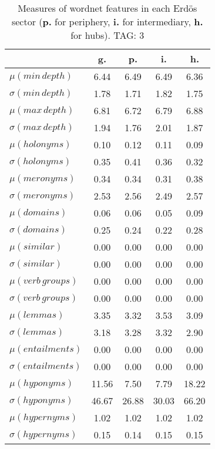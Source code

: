 \begin{table}[h!]
\begin{center}
\begin{tabular}{| l | c | c | c | c |}\hline
 & g. & p. & i. & h. \\\hline
$\mu(min\,depth)$ & 6.44  & 6.49  & 6.49  & 6.36 \\\hline
$\sigma(min\,depth)$ & 1.78  & 1.71  & 1.82  & 1.75 \\\hline
$\mu(max\,depth)$ & 6.81  & 6.72  & 6.79  & 6.88 \\\hline
$\sigma(max\,depth)$ & 1.94  & 1.76  & 2.01  & 1.87 \\\hline
$\mu(holonyms)$ & 0.10  & 0.12  & 0.11  & 0.09 \\\hline
$\sigma(holonyms)$ & 0.35  & 0.41  & 0.36  & 0.32 \\\hline
$\mu(meronyms)$ & 0.34  & 0.34  & 0.31  & 0.38 \\\hline
$\sigma(meronyms)$ & 2.53  & 2.56  & 2.49  & 2.57 \\\hline
$\mu(domains)$ & 0.06  & 0.06  & 0.05  & 0.09 \\\hline
$\sigma(domains)$ & 0.25  & 0.24  & 0.22  & 0.28 \\\hline
$\mu(similar)$ & 0.00  & 0.00  & 0.00  & 0.00 \\\hline
$\sigma(similar)$ & 0.00  & 0.00  & 0.00  & 0.00 \\\hline
$\mu(verb\,groups)$ & 0.00  & 0.00  & 0.00  & 0.00 \\\hline
$\sigma(verb\,groups)$ & 0.00  & 0.00  & 0.00  & 0.00 \\\hline
$\mu(lemmas)$ & 3.35  & 3.32  & 3.53  & 3.09 \\\hline
$\sigma(lemmas)$ & 3.18  & 3.28  & 3.32  & 2.90 \\\hline
$\mu(entailments)$ & 0.00  & 0.00  & 0.00  & 0.00 \\\hline
$\sigma(entailments)$ & 0.00  & 0.00  & 0.00  & 0.00 \\\hline
$\mu(hyponyms)$ & 11.56  & 7.50  & 7.79  & 18.22 \\\hline
$\sigma(hyponyms)$ & 46.67  & 26.88  & 30.03  & 66.20 \\\hline
$\mu(hypernyms)$ & 1.02  & 1.02  & 1.02  & 1.02 \\\hline
$\sigma(hypernyms)$ & 0.15  & 0.14  & 0.15  & 0.15 \\\hline
\end{tabular}
\caption{Measures of wordnet features in each Erd\"os sector ({{\bf p.}} for periphery, {{\bf i.}} for intermediary, {{\bf h.}} for hubs). TAG: 3}
\end{center}
\end{table}
